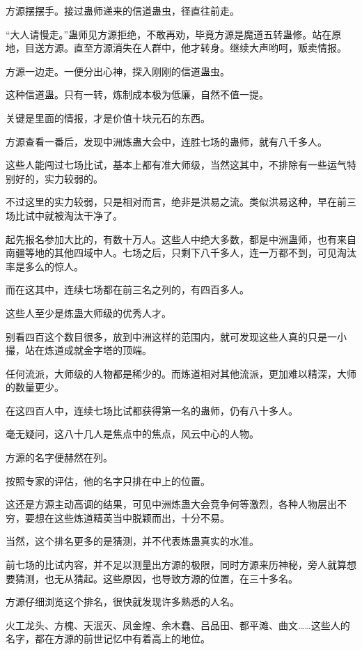 \begin{this_body}
方源摆摆手。接过蛊师递来的信道蛊虫，径直往前走。

“大人请慢走。”蛊师见方源拒绝，不敢再劝，毕竟方源是魔道五转蛊修。站在原地，目送方源。直至方源消失在人群中，他才转身。继续大声哟呵，贩卖情报。

方源一边走。一便分出心神，探入刚刚的信道蛊虫。

这种信道蛊。只有一转，炼制成本极为低廉，自然不值一提。

关键是里面的情报，才是价值十块元石的东西。

方源查看一番后，发现中洲炼蛊大会中，连胜七场的蛊师，就有八千多人。

这些人能闯过七场比试，基本上都有准大师级，当然这其中，不排除有一些运气特别好的，实力较弱的。

不过这里的实力较弱，只是相对而言，绝非是洪易之流。类似洪易这种，早在前三场比试中就被淘汰干净了。

起先报名参加大比的，有数十万人。这些人中绝大多数，都是中洲蛊师，也有来自南疆等地的其他四域中人。七场之后，只剩下八千多人，连一万都不到，可见淘汰率是多么的惊人。

而在这其中，连续七场都在前三名之列的，有四百多人。

这些人至少是炼蛊大师级的优秀人才。

别看四百这个数目很多，放到中洲这样的范围内，就可发现这些人真的只是一小撮，站在炼道成就金字塔的顶端。

任何流派，大师级的人物都是稀少的。而炼道相对其他流派，更加难以精深，大师的数量更少。

在这四百人中，连续七场比试都获得第一名的蛊师，仍有八十多人。

毫无疑问，这八十几人是焦点中的焦点，风云中心的人物。

方源的名字便赫然在列。

按照专家的评估，他的名字只排在中上的位置。

这还是方源主动高调的结果，可见中洲炼蛊大会竞争何等激烈，各种人物层出不穷，要想在这些炼道精英当中脱颖而出，十分不易。

当然，这个排名更多的是猜测，并不代表炼蛊真实的水准。

前七场的比试内容，并不足以测量出方源的极限，同时方源来历神秘，旁人就算想要猜测，也无从猜起。这些原因，也导致方源的位置，在三十多名。

方源仔细浏览这个排名，很快就发现许多熟悉的人名。

火工龙头、方槐、天泯灭、凤金煌、余木蠢、吕品田、都平滩、曲文……这些人的名字，都在方源的前世记忆中有着高上的地位。


\end{this_body}
